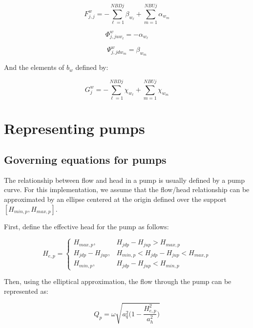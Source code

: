\documentclass[11pt]{article}
\begin{document}
\begin{equation}
  \boxed{
  F_{j,j}^w = - \sum_{\ell=1}^{NBDj} \beta_{w_\ell} + \sum_{m=1}^{NBUj} \alpha_{w_m}
  }
\end{equation}

\begin{equation}
  \boxed{
  \Phi_{j,juw_\ell}^w = - \alpha_{w_\ell}
  }
\end{equation}

\begin{equation}
  \boxed{
  \Psi_{j,jdw_m}^w = \beta_{w_m}
  }
\end{equation}

And the elements of $b_w$ defined by:

\begin{equation}
  \boxed{
  G_j^w = - \sum_{\ell=1}^{NBDj} \chi_{w_\ell} + \sum_{m=1}^{NBUj} \chi_{w_m}
  }
\end{equation}

\section{Representing pumps}

\subsection{Governing equations for pumps}

The relationship between flow and head in a pump is usually defined by a pump
curve. For this implementation, we assume that the flow/head relationship can be
approximated by an ellipse centered at the origin defined over the support
$[H_{min,p}, H_{max,p}]$.

First, define the effective head for the pump as follows:

\begin{equation}
  H_{e,p} =
  \begin{cases}
    H_{max,p}, & H_{jdp} - H_{jup} > H_{max,p} \\
    H_{jdp} - H_{jup}, & H_{min,p} < H_{jdp} - H_{jup} < H_{max,p} \\
    H_{min,p}, & H_{jdp} - H_{jup} < H_{min,p}
  \end{cases}
\end{equation}

Then, using the elliptical approximation, the flow through the pump can be
represented as:

\begin{equation}
 Q_p = \omega \sqrt{a_q^2 \bigl( 1 - \frac{H_{e,p}^2}{a_h^2} \bigr)} 
\end{equation}
\end{document}
